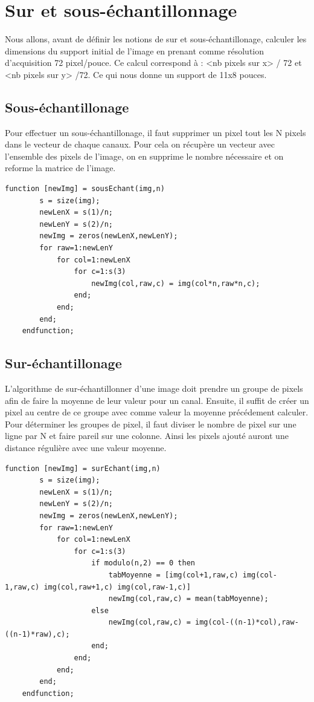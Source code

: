 \documentclass[a4paper,11pt]{article}
\begin{document}
  \section{Sur et sous-échantillonnage}
  Nous allons, avant de définir les notions de sur et sous-échantillonage, calculer les dimensions du support
  initial de l'image en prenant comme résolution d'acquisition 72 pixel/pouce. Ce calcul correspond à :
  <nb pixels sur x> / 72 et <nb pixels sur y> /72. Ce qui nous donne un support de 11x8 pouces.
  
  \subsection{Sous-échantillonage}
  Pour effectuer un sous-échantillonage, il faut supprimer un pixel tout les N pixels dans le vecteur de chaque canaux.
  Pour cela on récupère un vecteur avec l'ensemble des pixels de l'image, on en supprime le nombre nécessaire
  et on reforme la matrice de l'image.\\

  \begin{lstlisting}[caption=Fonction permettant le sous-échantillonnement d'une image]
    function [newImg] = sousEchant(img,n)
        s = size(img);
        newLenX = s(1)/n;
        newLenY = s(2)/n;
        newImg = zeros(newLenX,newLenY);
        for raw=1:newLenY
            for col=1:newLenX
                for c=1:s(3)
                    newImg(col,raw,c) = img(col*n,raw*n,c);
                end;
            end;
        end;
    endfunction;
  \end{lstlisting}
  
  \subsection{Sur-échantillonage}
  L'algorithme de sur-échantillonner d'une image doit prendre un groupe de pixels afin de faire la moyenne de leur valeur
  pour un canal. Ensuite, il suffit de créer un pixel au centre de ce groupe avec comme valeur la moyenne précédement calculer.
  Pour déterminer les groupes de pixel, il faut diviser le nombre de pixel sur une ligne par N et faire pareil sur une colonne.
  Ainsi les pixels ajouté auront une distance régulière avec une valeur moyenne.\\
  
  \begin{lstlisting}[caption=Fonction permettant le sur-échantillonnement d'une image]
    function [newImg] = surEchant(img,n)
        s = size(img);
        newLenX = s(1)/n;
        newLenY = s(2)/n;
        newImg = zeros(newLenX,newLenY);
        for raw=1:newLenY
            for col=1:newLenX
                for c=1:s(3)
                    if modulo(n,2) == 0 then
                        tabMoyenne = [img(col+1,raw,c) img(col-1,raw,c) img(col,raw+1,c) img(col,raw-1,c)]
                        newImg(col,raw,c) = mean(tabMoyenne);    
                    else
                        newImg(col,raw,c) = img(col-((n-1)*col),raw-((n-1)*raw),c);
                    end;
                end;
            end;
        end;
    endfunction;
  \end{lstlisting}
  
\end{document}
